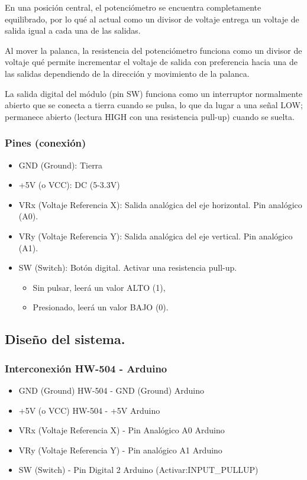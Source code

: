\documentclass[conference]{IEEEtran}
\begin{document}
    En una posición central, el potenciómetro se encuentra completamente equilibrado, por lo qué al actual como un divisor de voltaje entrega un voltaje de salida igual a cada una de las salidas.

    Al mover la palanca, la resistencia del potenciómetro funciona como un divisor de voltaje qué permite incrementar el voltaje de salida con preferencia hacia una de las salidas dependiendo de la dirección y movimiento de la palanca.

    La salida digital del módulo (pin SW) funciona como un interruptor normalmente abierto que se conecta a tierra cuando se pulsa, lo que da lugar a una señal LOW; permanece abierto (lectura HIGH con una resistencia pull-up) cuando se suelta.

    \subsubsection{Pines (conexión)}
    \begin{itemize}
      \item GND (Ground): Tierra
      \item +5V (o VCC): DC (5-3.3V)
      \item VRx (Voltaje Referencia X): Salida analógica del eje horizontal. Pin analógico (A0).
      \item VRy (Voltaje Referencia Y): Salida analógica del eje vertical. Pin analógico (A1).
      \item SW (Switch): Botón digital. Activar una resistencia pull-up. 
        \begin{itemize}
          \item Sin pulsar, leerá un valor ALTO (1),
         \item Presionado, leerá un valor BAJO (0).
        \end{itemize}
    \end{itemize}

  \subsection{Diseño del sistema.}
    \subsubsection{Interconexión HW-504 - Arduino}
    \begin{itemize}
      \item GND (Ground) HW-504 - GND (Ground) Arduino
      \item +5V (o VCC) HW-504 - +5V Arduino
      \item VRx (Voltaje Referencia X) - Pin Analógico A0 Arduino
      \item VRy (Voltaje Referencia Y) - Pin analógico A1 Arduino
      \item SW (Switch) - Pin Digital 2 Arduino (Activar:INPUT\_PULLUP)
    \end{itemize}
\end{document}
